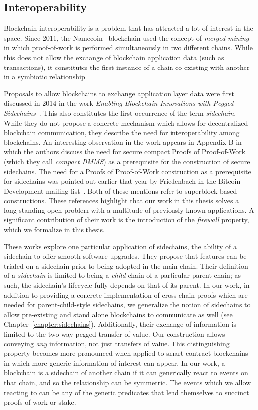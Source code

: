 \subsection{Interoperability}
Blockchain interoperability is a problem that has attracted a lot of interest in
the space. Since 2011, the Namecoin~\cite{namecoin} blockchain used the concept
of \emph{merged mining} in which proof-of-work is performed simultaneously in
two different chains. While this does not allow the exchange of
blockchain application data (such as transactions), it constitutes the first
instance of a chain co-existing with another in a symbiotic relationship.

Proposals to allow blockchains to exchange application layer data were first
discussed in 2014 in the work
\emph{Enabling Blockchain Innovations with Pegged Sidechains}~\cite{sidechains}.
This also constitutes the first occurrence of the term \emph{sidechain}. While
they do not propose a concrete mechanism which allows for decentralized
blockchain communication, they describe the need for interoperability among
blockchains. An interesting observation in the work appears in Appendix B in
which the authors discuss the need for secure compact Proofs of Proof-of-Work
(which they call \emph{compact DMMS}) as a prerequisite for the construction of
secure sidechains. The need for a Proofs of Proof-of-Work construction as a
prerequisite for sidechains was pointed out earlier that year by
Friedenbach in the Bitcoin Development mailing list~\cite{friedenbach}. Both of
these mentions refer to superblock-based constructions. These references
highlight that our work in this thesis solves a long-standing open problem with
a multitude of previously known applications.  A significant
contribution of their work is the introduction of the \emph{firewall} property,
which we formalize in this thesis.

These works explore one particular application of sidechains, the ability of a
sidechain to offer smooth software upgrades. They propose that features can be
trialed on a sidechain prior to being adopted in the main chain. Their
definition of a \emph{sidechain} is limited to being a \emph{child} chain of a
particular parent chain; as such, the sidechain's lifecycle fully depends on
that of its parent. In our work, in addition to providing a concrete
implementation of cross-chain proofs which are needed for parent-child-style
sidechains, we generalize the notion of sidechains to allow pre-existing and
stand alone blockchains to communicate as well (see
Chapter~\ref{chapter:sidechains}). Additionally, their exchange of information
is limited to the two-way pegged transfer of value. Our construction allows
conveying \emph{any} information, not just transfers of value. This
distinguishing property becomes more pronounced when applied to smart contract
blockchains in which more generic information of interest can appear. In our
work, a blockchain is a sidechain of another chain if it can generically react
to events on that chain, and so the relationship can be symmetric. The events
which we allow reacting to can be any of the generic predicates that lend
themselves to succinct proofs-of-work or stake.

